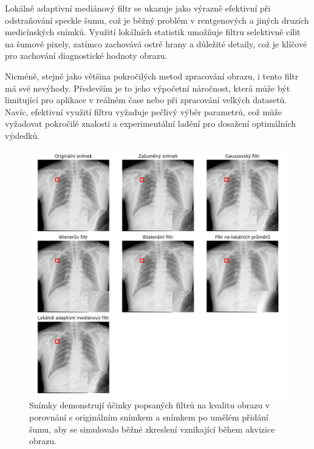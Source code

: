 \documentclass[male,czech,api_ing]{thesis}
\begin{document}
Lokálně adaptivní mediánový filtr se ukazuje jako výrazně efektivní při odstraňování speckle šumu, což je běžný problém v rentgenových a jiných druzích medicínských snímků. Využití lokálních statistik umožňuje filtru selektivně cílit na šumové pixely, zatímco zachovává ostré hrany a důležité detaily, což je klíčové pro zachování diagnostické hodnoty obrazu.

Nicméně, stejně jako většina pokročilých metod zpracování obrazu, i tento filtr má své nevýhody. Především je to jeho výpočetní náročnost, která může být limitující pro aplikace v reálném čase nebo při zpracování velkých datasetů. Navíc, efektivní využití filtru vyžaduje pečlivý výběr parametrů, což může vyžadovat pokročilé znalosti a experimentální ladění pro dosažení optimálních výsledků. \cite{LocalAdaptiveMedianFilter}

\begin{figure}[ht]
    \centering
    \includegraphics[width=\linewidth]{Prilohy/Obrazky/NoiseReduction.png}
    \caption{Snímky demonstrují účinky popsaných filtrů na kvalitu obrazu v porovnání s originálním snímkem a snímkem po umělém přidání šumu, aby se simulovalo běžné zkreslení vznikající během akvizice obrazu.}
    \label{fig:noise_reduction_filters}
\end{figure}

\end{document}

